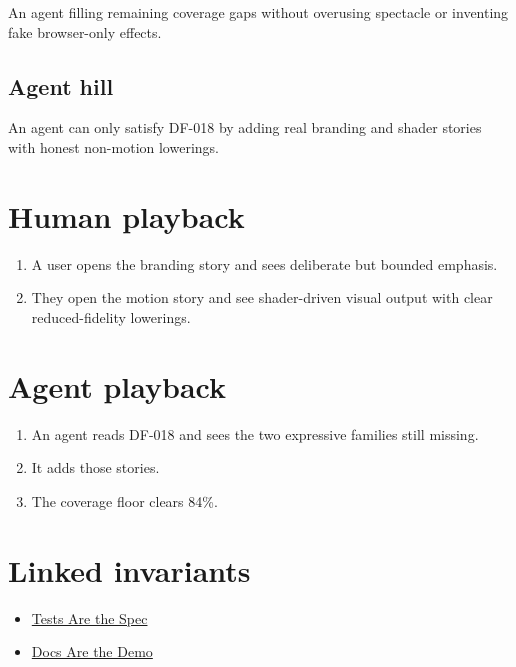 An agent filling remaining coverage gaps without overusing spectacle or inventing fake browser-only effects.

\subsection{Agent hill}\label{record-080-agent-hill}

An agent can only satisfy DF-018 by adding real branding and shader stories with honest non-motion lowerings.

\section{Human playback}\label{record-080-human-playback}

\begin{enumerate}
\def\labelenumi{\arabic{enumi}.}
\tightlist
\item
  A user opens the branding story and sees deliberate but bounded emphasis.
\item
  They open the motion story and see shader-driven visual output with clear reduced-fidelity lowerings.
\end{enumerate}

\section{Agent playback}\label{record-080-agent-playback}

\begin{enumerate}
\def\labelenumi{\arabic{enumi}.}
\tightlist
\item
  An agent reads DF-018 and sees the two expressive families still missing.
\item
  It adds those stories.
\item
  The coverage floor clears 84\%.
\end{enumerate}

\section{Linked invariants}\label{record-080-linked-invariants}

\begin{itemize}
\tightlist
\item
  \href{https://github.com/flyingrobots/bijou/blob/cbd70612140e7a450d764b3c7be1c6af878b99bc/docs/invariants/tests-are-the-spec.md}{Tests Are the Spec}
\item
  \href{https://github.com/flyingrobots/bijou/blob/cbd70612140e7a450d764b3c7be1c6af878b99bc/docs/invariants/docs-are-the-demo.md}{Docs Are the Demo}
\end{itemize}

